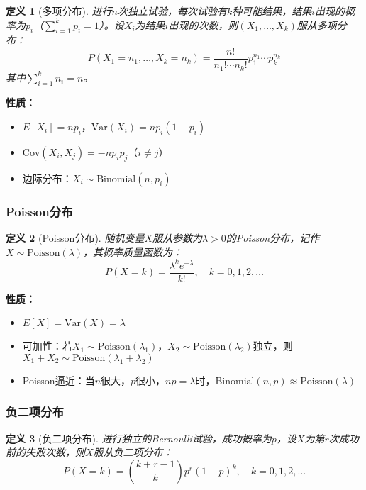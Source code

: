 \documentclass[12pt,a4paper]{article}
\newtheorem{definition}{定义}[section]
\theoremstyle{remark}
\begin{document}
\begin{definition}[多项分布]
进行$n$次独立试验，每次试验有$k$种可能结果，结果$i$出现的概率为$p_i$（$\sum_{i=1}^k p_i = 1$）。设$X_i$为结果$i$出现的次数，则$(X_1, \ldots, X_k)$服从多项分布：
$$P(X_1 = n_1, \ldots, X_k = n_k) = \frac{n!}{n_1! \cdots n_k!} p_1^{n_1} \cdots p_k^{n_k}$$
其中$\sum_{i=1}^k n_i = n$。
\end{definition}

\textbf{性质：}
\begin{itemize}
\item $E[X_i] = np_i$，$\text{Var}(X_i) = np_i(1-p_i)$
\item $\text{Cov}(X_i, X_j) = -np_ip_j$（$i \neq j$）
\item 边际分布：$X_i \sim \text{Binomial}(n, p_i)$
\end{itemize}

\subsubsection{Poisson分布}

\begin{definition}[Poisson分布]
随机变量$X$服从参数为$\lambda > 0$的Poisson分布，记作$X \sim \text{Poisson}(\lambda)$，其概率质量函数为：
$$P(X = k) = \frac{\lambda^k e^{-\lambda}}{k!}, \quad k = 0, 1, 2, \ldots$$
\end{definition}

\textbf{性质：}
\begin{itemize}
\item $E[X] = \text{Var}(X) = \lambda$
\item 可加性：若$X_1 \sim \text{Poisson}(\lambda_1)$，$X_2 \sim \text{Poisson}(\lambda_2)$独立，则$X_1 + X_2 \sim \text{Poisson}(\lambda_1 + \lambda_2)$
\item Poisson逼近：当$n$很大，$p$很小，$np = \lambda$时，$\text{Binomial}(n,p) \approx \text{Poisson}(\lambda)$
\end{itemize}

\subsubsection{负二项分布}

\begin{definition}[负二项分布]
进行独立的Bernoulli试验，成功概率为$p$，设$X$为第$r$次成功前的失败次数，则$X$服从负二项分布：
$$P(X = k) = \binom{k+r-1}{k} p^r (1-p)^k, \quad k = 0, 1, 2, \ldots$$
\end{definition}
\end{document}
